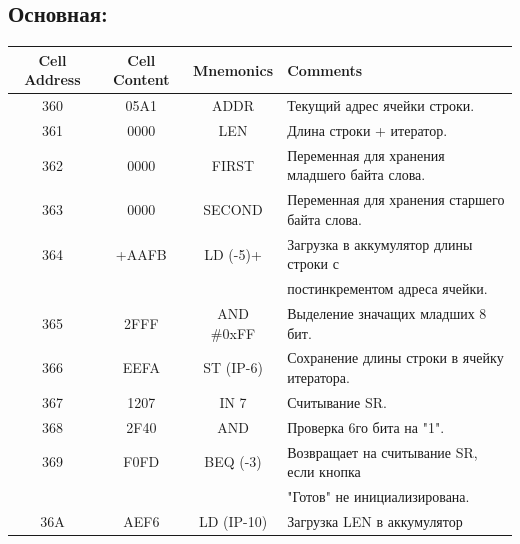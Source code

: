 \subsection{Основная:}
\begin{center}
    \begin{tabular}{|c|c|c|l|}
        \hline
        \textbf{Cell Address} & \textbf{Cell Content} & \textbf{Mnemonics} & \textbf{Comments}                                   \\
        \hline
        360                   & 05A1                  & ADDR               & Текущий адрес ячейки строки.                        \\
        361                   & 0000                  & LEN                & Длина строки + итератор.                            \\
        362                   & 0000                  & FIRST              & Переменная для хранения младшего байта слова.       \\
        363                   & 0000                  & SECOND             & Переменная для хранения старшего байта слова.       \\
        \hline
        364                   & +AAFB                 & LD (-5)+           & Загрузка в аккумулятор длины строки с               \\
        &                       &                    & постинкрементом адреса ячейки.                      \\
        365                   & 2FFF                  & AND \#0xFF         & Выделение значащих младших 8 бит.                   \\
        366                   & EEFA                  & ST (IP-6)          & Сохранение длины строки в ячейку итератора.         \\
        367                   & 1207                  & IN 7               & Считывание SR.                                      \\
        368                   & 2F40                  & AND #0x40          & Проверка 6го бита на "1".                           \\
        369                   & F0FD                  & BEQ (-3)           & Возвращает на считывание SR, если кнопка            \\
        &                       &                    & "Готов" не инициализирована.                        \\
        36A                   & AEF6                  & LD (IP-10)         & Загрузка LEN в аккумулятор                          \\

\end{tabular}
\end{center}
